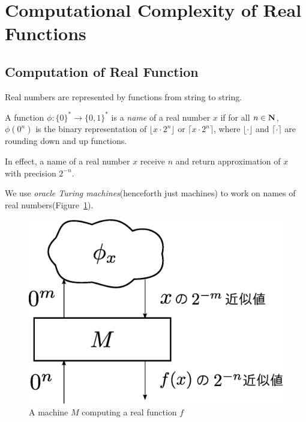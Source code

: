 \section{Computational Complexity of Real Functions}
\label{section: preliminaries}

\subsection{Computation of Real Function}

Real numbers are represented by functions from string to string.
\begin{definition}
 A function $\phi \colon \{0\} ^* \to \{0, 1\}^*$ is a \emph{name} of a real number $x$ 
 if for all $n \in \mathbf N$,
  $\phi(0^n)$ is the binary representation of $\lfloor x \cdot 2^n \rfloor$ or
  $\lceil x \cdot 2^n \rceil$,
 where $\lfloor \cdot \rfloor$ and $\lceil \cdot \rceil$ are 
 rounding down and up functions.
 \end{definition}
In effect, a name of a real number $x$ receive $n$ and return approximation of $x$ with precision $2^{-n}$.

We use \emph{oracle Turing machines}(henceforth just machines)
to work on names of real numbers(Figure~\ref{fig:model-of-function}).

 \begin{figure}
  \begin{center}
   \includegraphics[height=0.15\textheight]{image/model-of-function.eps}
  \end{center}
  \caption{A machine $M$ computing a real function $f$}
  \label{fig:model-of-function}
 \end{figure}

